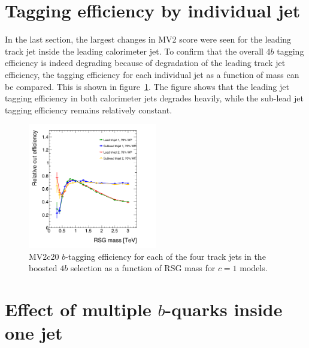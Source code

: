 \section{Tagging efficiency by individual jet}

In the last section, the largest changes in MV2 score were seen for the leading track jet inside the leading calorimeter jet. To confirm that the overall $4b$ tagging efficiency is indeed degrading because of degradation of the leading track jet efficiency, the tagging efficiency for each individual jet as a function of mass can be compared. This is shown in figure~\ref{fig:btag_ind_jet}. The figure shows that the leading jet tagging efficiency in both calorimeter jets degrades heavily, while the sub-lead jet tagging efficiency remains relatively constant.

\begin{figure}[h!]
  \centering
  \captionsetup{justification=centering}

  \includegraphics[width=0.5\textwidth]{figures/Btag_singlejet_comparison}
  \caption{MV2c20 $b$-tagging efficiency for each of the four track jets in the boosted $4b$ selection as a function of RSG mass for $c=1$ models.}
  \label{fig:btag_ind_jet}
\end{figure}

\section{Effect of multiple $b$-quarks inside one jet}

